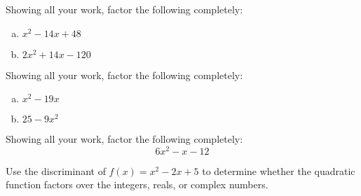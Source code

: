 \documentclass[11pt,letterpaper]{article}
\begin{document}

 Showing all your work, factor the following completely:
	\begin{enumerate}[(a)]
	\item $x^2 - 14x + 48$
	\item $2x^2 + 14x - 120$
	\end{enumerate}



\newpage



  Showing all your work, factor the following completely:
	\begin{enumerate}[(a)]
	\item $x^2 - 19x$
	\item $25 - 9x^2$
	\end{enumerate}



\newpage



 Showing all your work, factor the following completely:
	\[
	6x^2 - x - 12
	\]



\newpage



 Use the discriminant of $f(x)= x^2 - 2x + 5$ to determine whether the quadratic function factors over the integers, reals, or complex numbers. 
\end{document}
